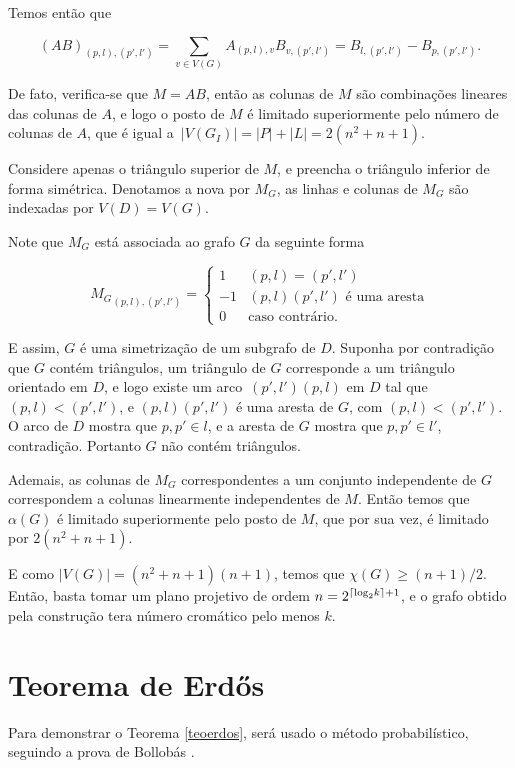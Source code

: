Temos então que 

\[(AB)_{(p,l),(p',l')} = \sum\limits_{v \in V(G)} A_{(p,l),v} B_{v,(p',l')} = B_{l,(p',l')} - B_{p,(p',l')}.\]

De fato, verifica-se que $M = AB$, então as colunas de $M$ são combinações lineares das colunas de $A$, e logo o posto de $M$ é limitado superiormente pelo número de colunas de $A$, que é igual a~$|V(G_I)| = |P| + |L| = 2(n^2 + n + 1)$.

Considere apenas o triângulo superior de $M$, e preencha o triângulo inferior de forma simétrica. Denotamos a nova por $M_G$, as linhas e colunas de $M_G$ são indexadas por $V(D) = V(G)$.

Note que $M_G$ está associada ao grafo $G$ da seguinte forma

\[ {M_G}_{(p,l), (p',l')} = \begin{cases} 
      1 & (p,l) = (p',l')\\
      -1 & (p,l)(p',l') \text{ é uma aresta}\\
      0 & \text{caso contrário.}
   \end{cases}
\]

E assim, $G$ é uma simetrização de um subgrafo de $D$. Suponha por contradição que $G$ contém triângulos, um triângulo de $G$ corresponde a um triângulo orientado em $D$, e logo existe um arco~$(p',l')(p,l)$ em $D$ tal que $(p,l) < (p',l')$, e $(p,l)(p',l')$ é uma aresta de $G$, com $(p,l) < (p',l')$. O arco de $D$ mostra que $p,p' \in l$, e a aresta de $G$ mostra que $p,p' \in l'$, contradição. Portanto $G$ não contém triângulos.

Ademais, as colunas de $M_G$ correspondentes a um conjunto independente de $G$ correspondem a colunas linearmente independentes de $M$. Então temos que $\alpha(G)$ é limitado superiormente pelo posto de $M$, que por sua vez, é limitado por $2(n^2+n+1)$.

E como $|V(G)| = (n^2+n+1)(n+1)$, temos que $\chi(G) \geq (n+1)/2$. Então, basta tomar um plano projetivo de ordem $n = 2^{\ceil*{\text{log}_2 k}+1}$, e o grafo obtido pela construção tera número cromático pelo menos $k$.


\section{Teorema de Erd\H{o}s}

Para demonstrar o Teorema \ref{teoerdos}, será usado o método probabilístico, seguindo a prova de Bollobás \cite{bollobas2013modern}.

